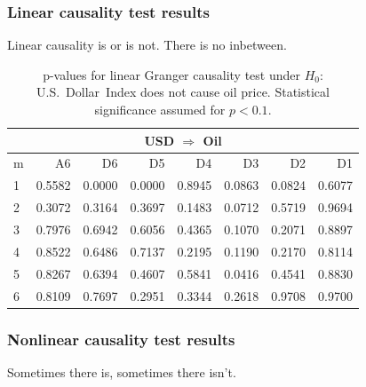 \subsubsection{Linear causality test results}
Linear causality is or is not. There is no inbetween.

\begin{table}[h]
\begin{center}
\begin{tabular}{l|r r r r r r r}
\multicolumn{8}{c}{USD $\Rightarrow$ Oil}\\
\hline\hline
m & A6 & D6 & D5 & D4 & D3 & D2 & D1 \\
\hline
1 & 0.5582 & \cellcolor{mygreen}0.0000 & \cellcolor{mygreen}0.0000 & 0.8945 & \cellcolor{mygreen!50}0.0863 & \cellcolor{mygreen!50}0.0824 & 0.6077 \\
2 & 0.3072 & 0.3164 & 0.3697 & 0.1483 & \cellcolor{mygreen!50}0.0712 & 0.5719 & 0.9694 \\
3 & 0.7976 & 0.6942 & 0.6056 & 0.4365 & 0.1070 & 0.2071 & 0.8897 \\
4 & 0.8522 & 0.6486 & 0.7137 & 0.2195 & 0.1190 & 0.2170 & 0.8114 \\
5 & 0.8267 & 0.6394 & 0.4607 & 0.5841 & \cellcolor{mygreen}0.0416 & 0.4541 & 0.8830 \\
6 & 0.8109 & 0.7697 & 0.2951 & 0.3344 & 0.2618 & 0.9708 & 0.9700 \\
\hline\hline
\end{tabular}
\caption{p-values for linear Granger causality test under $H_0$:\\
\mbox{U.S. Dollar Index} does not cause oil price. Statistical significance assumed for $p<0.1$.}
\end{center}
\end{table}

\subsubsection{Nonlinear causality test results}
Sometimes there is, sometimes there isn't.

